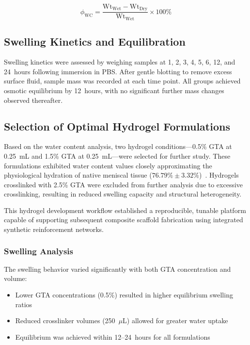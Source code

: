 \[
\phi_{\text{WC}} = \frac{\text{Wt}_{\text{Wet}} - \text{Wt}_{\text{Dry}}}{\text{Wt}_{\text{Wet}}} \times 100\%
\]

\subsection{Swelling Kinetics and Equilibration}

Swelling kinetics were assessed by weighing samples at 1, 2, 3, 4, 5, 6, 12, and 24~hours following immersion in PBS. After gentle blotting to remove excess surface fluid, sample mass was recorded at each time point. All groups achieved osmotic equilibrium by 12~hours, with no significant further mass changes observed thereafter.

\subsection{Selection of Optimal Hydrogel Formulations}

Based on the water content analysis, two hydrogel conditions—0.5\% GTA at 0.25~mL and 1.5\% GTA at 0.25~mL—were selected for further study. These formulations exhibited water content values closely approximating the physiological hydration of native meniscal tissue (\(76.79\% \pm 3.32\%\))~\cite{morejon2020compressiveproperties}. Hydrogels crosslinked with 2.5\% GTA were excluded from further analysis due to excessive crosslinking, resulting in reduced swelling capacity and structural heterogeneity.

\bigskip

This hydrogel development workflow established a reproducible, tunable platform capable of supporting subsequent composite scaffold fabrication using integrated synthetic reinforcement networks.

\subsubsection{Swelling Analysis}

The swelling behavior varied significantly with both GTA concentration and volume:
\begin{itemize}
    \item Lower GTA concentrations (0.5\%) resulted in higher equilibrium swelling ratios
    \item Reduced crosslinker volumes (250~\(\mu\)L) allowed for greater water uptake
    \item Equilibrium was achieved within 12--24~hours for all formulations
\end{itemize}

